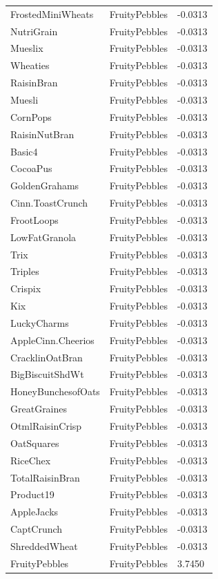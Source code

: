 \begin{table}[!htbp]
\begin{tabular}{lll}
FrostedMiniWheats & FruityPebbles & -0.0313
\\
NutriGrain & FruityPebbles & -0.0313
\\
Mueslix & FruityPebbles & -0.0313
\\
Wheaties & FruityPebbles & -0.0313
\\
RaisinBran & FruityPebbles & -0.0313
\\
Muesli & FruityPebbles & -0.0313
\\
CornPops & FruityPebbles & -0.0313
\\
RaisinNutBran & FruityPebbles & -0.0313
\\
Basic4 & FruityPebbles & -0.0313
\\
CocoaPus & FruityPebbles & -0.0313
\\
GoldenGrahams & FruityPebbles & -0.0313
\\
Cinn.ToastCrunch & FruityPebbles & -0.0313
\\
FrootLoops & FruityPebbles & -0.0313
\\
LowFatGranola & FruityPebbles & -0.0313
\\
Trix & FruityPebbles & -0.0313
\\
Triples & FruityPebbles & -0.0313
\\
Crispix & FruityPebbles & -0.0313
\\
Kix & FruityPebbles & -0.0313
\\
LuckyCharms & FruityPebbles & -0.0313
\\
AppleCinn.Cheerios & FruityPebbles & -0.0313
\\
CracklinOatBran & FruityPebbles & -0.0313
\\
BigBiscuitShdWt & FruityPebbles & -0.0313
\\
HoneyBunchesofOats & FruityPebbles & -0.0313
\\
GreatGraines & FruityPebbles & -0.0313
\\
OtmlRaisinCrisp & FruityPebbles & -0.0313
\\
OatSquares & FruityPebbles & -0.0313
\\
RiceChex & FruityPebbles & -0.0313
\\
TotalRaisinBran & FruityPebbles & -0.0313
\\
Product19 & FruityPebbles & -0.0313
\\
AppleJacks & FruityPebbles & -0.0313
\\
CaptCrunch & FruityPebbles & -0.0313
\\
ShreddedWheat & FruityPebbles & -0.0313
\\
FruityPebbles & FruityPebbles & 3.7450

\end{tabular}
\end{table}
